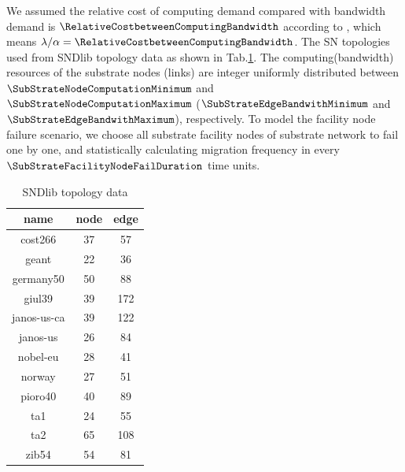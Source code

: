 We assumed the relative cost of computing demand  compared with bandwidth demand is $\RelativeCostbetweenComputingBandwidth$ according to  \cite{armbrust2009above,yu2010survivable}, which means $\lambda/\alpha=\RelativeCostbetweenComputingBandwidth$.
The SN topologies used from SNDlib topology data \cite{orlowski2010sndlib}as shown in Tab.\ref{tab:SNDlibTopo}.
The computing(bandwidth) resources of the substrate nodes (links) are integer uniformly distributed between $\SubStrateNodeComputationMinimum$ and $\SubStrateNodeComputationMaximum$ ($\SubStrateEdgeBandwithMinimum$ and $\SubStrateEdgeBandwithMaximum$), respectively. To model the facility node failure scenario, we choose all substrate facility nodes of substrate network to fail one by one, and statistically calculating migration frequency in every $\SubStrateFacilityNodeFailDuration$ time units.
\begin{table}[htb]
\centering
\caption{SNDlib topology data}\label{tab:SNDlibTopo}
\begin{tabular}{|c|c|c|}
  \hline
  name & node & edge \\
  \hline
  cost266& 37& 57\\
  geant& 22& 36\\
  germany50& 50& 88\\
  giul39& 39& 172\\
  janos-us-ca& 39& 122\\
  janos-us& 26& 84\\
  nobel-eu& 28& 41\\
  norway& 27& 51\\
  pioro40& 40& 89\\
  ta1& 24& 55\\
  ta2& 65& 108\\
  zib54& 54& 81\\
  \hline

\end{tabular}
\end{table}


